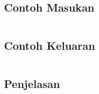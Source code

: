\documentclass{article}
\begin{document}
\\

\begin{multicols}{2}
\subsection*{Contoh Masukan}
\begin{lstlisting}

\end{lstlisting}
\columnbreak
\subsection*{Contoh Keluaran}
\begin{lstlisting}

\end{lstlisting}
\vfill
\null
\end{multicols}

\subsection*{Penjelasan}

\pagebreak
\end{document}
